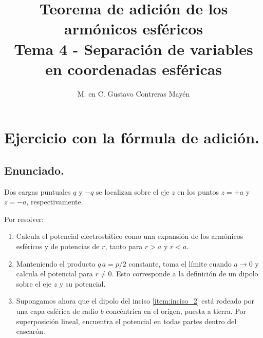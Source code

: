 

\title{Teorema de adición de los armónicos esféricos \\ {\large Tema 4 - Separación de variables en coordenadas esféricas}\vspace{-1ex}}
\author{M. en C. Gustavo Contreras Mayén}
\date{ }

\pagestyle{fancy}
\fancyhf{}
\lhead{\leftmark}
\rfoot{\thepage}
\setlength{\headheight}{16pt}%

\def\changemargin#1#2{\list{}{\rightmargin#2\leftmargin#1}\item[]}
\let\endchangemargin=\endlist 



\maketitle
\fontsize{14}{14}\selectfont
\tableofcontents
\newpage

\section{Ejercicio con la fórmula de adición.}
\subsection{Enunciado.}

Dos cargas puntuales $q$ y $-q$ se localizan sobre el eje $z$ en los puntos $z = +a$ y $z = -a$, respectivamente.

\begin{figure}[H]
    \centering
\end{figure}
Por resolver:
\begin{enumerate}[label=\arabic*)]
\item \label{item:inciso_1} Calcula el potencial electrostático como una expansión de los armónicos esféricos y de potencias de $r$, tanto para $r > a$ y $r < a$.
\item \label{item:inciso_2} Manteniendo el producto $q \, a = p /2$ constante, toma el límite cuando $a \to 0$ y calcula el potencial para $r \neq 0$. Esto corresponde a la definición de un dipolo sobre el eje $z$ y su potencial.
\item \label{item:inciso_3} Supongamos ahora que el dipolo del inciso \ref{item:inciso_2} está rodeado por una capa esférica de radio $b$ concéntrica en el origen, puesta a tierra. Por superposición lineal, encuentra el potencial en todas partes dentro del cascarón.
\end{enumerate}

